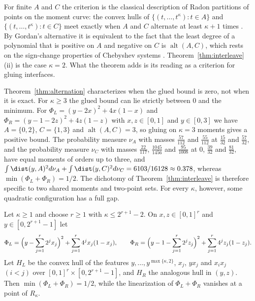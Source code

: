 For finite $A$ and $C$ the criterion is the classical description of Radon
partitions of points on the moment curve: the convex hulls of
$\{(t,\dots,t^\kappa):t\in A\}$ and $\{(t,\dots,t^\kappa):t\in C\}$ meet
exactly when $A$ and $C$ alternate at least $\kappa+1$ times
\citep{Breen1973}. By Gordan's alternative it is equivalent to the fact that
the least degree of a polynomial that is positive on $A$ and negative on $C$
is $\operatorname{alt}(A,C)$, which rests on the sign-change properties of
Chebyshev systems \citep{KarlinStudden1966}. Theorem~\ref{thm:interleave}(ii)
is the case $\kappa=2$. What the theorem adds is its reading as a criterion
for gluing interfaces.

Theorem~\ref{thm:alternation} characterizes when the glued bound is zero,
not when it is exact. For $\kappa\ge3$ the glued bound can lie strictly
between $0$ and the minimum. For $\Phi_L=(y-2x)^2+4x(1-x)$ and
$\Phi_R=(y-1-2z)^2+4z(1-z)$ with $x,z\in[0,1]$ and $y\in[0,3]$ we have
$A=\{0,2\}$, $C=\{1,3\}$ and $\operatorname{alt}(A,C)=3$, so gluing on
$\kappa=3$ moments gives a positive bound. The probability measure $\nu_A$
with masses $\tfrac{57}{112}$ and $\tfrac{55}{112}$ at $\tfrac{15}{32}$ and
$\tfrac{57}{32}$, and the probability measure $\nu_C$ with masses
$\tfrac{22}{117}$, $\tfrac{1045}{1456}$ and $\tfrac{95}{1008}$ at $0$,
$\tfrac{39}{32}$ and $\tfrac{81}{32}$, have equal moments of orders up to
three, and
$\int\dist(y,A)^2d\nu_A+\int\dist(y,C)^2d\nu_C=6103/16128\approx0.378$,
whereas $\min(\Phi_L+\Phi_R)=1/2$. The dichotomy of
Theorem~\ref{thm:interleave} is therefore specific to two shared moments and
two-point sets. For every $\kappa$, however, some quadratic configuration has
a full gap.

\begin{proposition}\label{prop:full-gap}
Let $\kappa\ge1$ and choose $r\ge1$ with $\kappa\le2^{r+1}-2$. On
$x,z\in[0,1]^r$ and $y\in[0,2^{r+1}-1]$ let
\[
\Phi_L=\Bigl(y-\sum_{j=1}^r2^jx_j\Bigr)^2+\sum_{j=1}^r4^jx_j(1-x_j),\qquad
\Phi_R=\Bigl(y-1-\sum_{j=1}^r2^jz_j\Bigr)^2+\sum_{j=1}^r4^jz_j(1-z_j).
\]
Let $H_L$ be the convex hull of the features $y,\dots,y^{\max\{\kappa,2\}}$,
$x_j$, $yx_j$ and $x_ix_j$ $(i<j)$ over $[0,1]^r\times[0,2^{r+1}-1]$, and $H_R$
the analogous hull in $(y,z)$. Then $\min(\Phi_L+\Phi_R)=1/2$, while the
linearization of $\Phi_L+\Phi_R$ vanishes at a point of $R_\kappa$.
\end{proposition}

